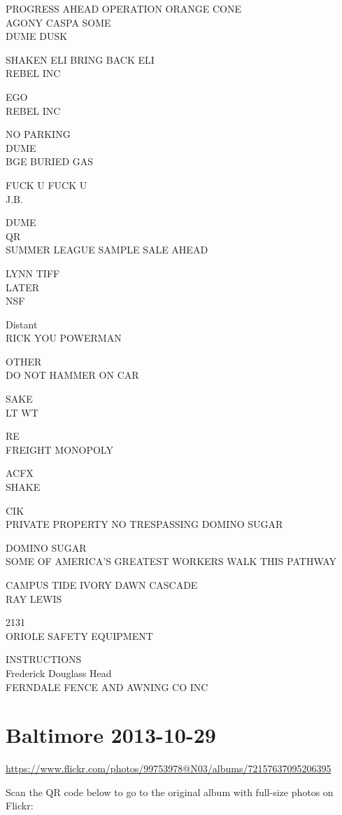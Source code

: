 \documentclass[10pt,letterpaper]{article}
\begin{document}
PROGRESS AHEAD OPERATION ORANGE CONE\\
AGONY CASPA SOME\\
DUME DUSK

SHAKEN ELI BRING BACK ELI\\
REBEL INC

EGO\\
REBEL INC

NO PARKING\\
DUME\\
BGE BURIED GAS

FUCK U FUCK U\\
J.B.

DUME\\
QR\\
SUMMER LEAGUE SAMPLE SALE AHEAD

LYNN TIFF\\
LATER\\
NSF

Distant\\
RICK YOU POWERMAN

OTHER\\
DO NOT HAMMER ON CAR

SAKE\\
LT WT

RE\\
FREIGHT MONOPOLY

ACFX\\
SHAKE

CIK\\
PRIVATE PROPERTY NO TRESPASSING DOMINO SUGAR

DOMINO SUGAR\\
SOME OF AMERICA'S GREATEST WORKERS WALK THIS PATHWAY

CAMPUS TIDE IVORY DAWN CASCADE\\
RAY LEWIS

2131\\
ORIOLE SAFETY EQUIPMENT

INSTRUCTIONS\\
Frederick Douglass Head\\
FERNDALE FENCE AND AWNING CO INC
\

\section*{Baltimore 2013-10-29}

\url{https://www.flickr.com/photos/99753978@N03/albums/72157637095206395}

Scan the QR code below to go to the original album with full-size photos on Flickr:
\end{document}
